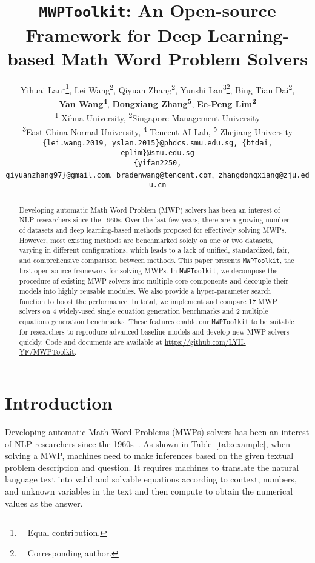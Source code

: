 \documentclass[11pt,a4paper]{article}
\title{\texttt{MWPToolkit}: An Open-source Framework for Deep Learning-based Math Word Problem Solvers}
\author{
Yihuai Lan\textsuperscript{\rm{1}}\thanks{\ \ Equal contribution.},
	Lei Wang\textsuperscript{\rm{2}}\footnotemark[1],
	Qiyuan Zhang\textsuperscript{\rm{2}\footnotemark[1]}, 
	Yunshi Lan\textsuperscript{\rm{3}}\thanks{\ \ Corresponding author.},
	Bing Tian Dai\textsuperscript{\rm{2}},\\
	\textbf{Yan Wang\textsuperscript{\rm{4}}},
	\textbf{Dongxiang Zhang\textsuperscript{\rm{5}}},
	\textbf{Ee-Peng Lim\textsuperscript{\rm{2}}}\\


	\textsuperscript{1} Xihua University, 
	\textsuperscript{2}Singapore Management University \\
	\textsuperscript{3}East China Normal University, 
	\textsuperscript{4} Tencent AI Lab,
	\textsuperscript{5} Zhejiang University\\
	
	\small {\tt \{lei.wang.2019, yslan.2015\}@phdcs.smu.edu.sg,\  \{btdai, eplim\}@smu.edu.sg} \\
	\small {\tt \{yifan2250, qiyuanzhang97\}@gmail.com},\
	\small {\tt bradenwang@tencent.com},\
	\small {\tt zhangdongxiang@zju.edu.cn}
}
\date{}
\begin{document}
\maketitle
\begin{abstract}

Developing automatic Math Word Problem (MWP) solvers has been an interest of NLP researchers since the 1960s.
Over the last few years, there are a growing number of datasets and deep learning-based methods proposed for effectively solving MWPs. 
However, most existing methods are benchmarked solely on one or two datasets, varying in different configurations, which leads to a lack of unified, standardized, fair, and comprehensive comparison between methods. 
This paper presents \texttt{MWPToolkit}, the first open-source framework for solving MWPs. 
In \texttt{MWPToolkit}, we decompose the procedure of existing MWP solvers into multiple core components and decouple their models into highly reusable modules. 
We also provide a hyper-parameter search function to boost the performance. 
In total, we implement and compare 17 MWP solvers on 4 widely-used single equation generation benchmarks and 2 multiple equations generation benchmarks. 
These features enable our \texttt{MWPToolkit} to be suitable for researchers to reproduce advanced baseline models and develop new MWP solvers quickly. 
Code and documents are available at \url{https://github.com/LYH-YF/MWPToolkit}. 

\end{abstract}

\section{Introduction}


Developing automatic Math Word Problems (MWPs) solvers has been an interest of NLP researchers since the 1960s~\cite{feigenbaum1963computers, bobrow1964natural}. 
As shown in Table~\ref{tab:example}, when solving a MWP, machines need to make inferences based on the given textual problem description and question. 
It requires machines to translate the natural language text into valid and solvable equations according to context, numbers, and unknown variables in the text and then compute to obtain the numerical values as the answer.
\end{document}
